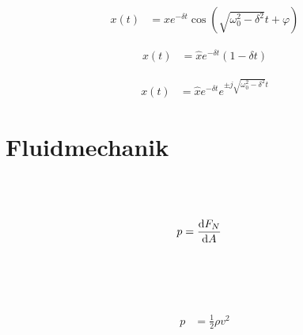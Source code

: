 \begin{boxleft}
\end{boxleft}\begin{boxrightshaded}
\begin{align}
x(t)&=\hat{x}e^{-\delta t}\cos(\sqrt{\omega_0^2-\delta^2}t+\varphi)
\end{align}
\end{boxrightshaded}

\begin{boxleft}
\end{boxleft}\begin{boxrightshaded}
\begin{align}
x(t)&=\hat{x}e^{-\delta t}(1-\delta t)
\end{align}
\end{boxrightshaded}

\begin{boxleft}
\end{boxleft}\begin{boxrightshaded}
\begin{align}
x(t)&=\hat{x}e^{-\delta t}e^{\pm j\sqrt{\omega_0^2-\delta^2}t}
\end{align}
\end{boxrightshaded}

\section{Fluidmechanik}

\begin{boxleft}
\\
\\
\end{boxleft}\begin{boxrightshaded}
\begin{align}
p&=\frac{\mathop{}\!\mathrm{d} F_N}{\mathop{}\!\mathrm{d} A}
\end{align}
\end{boxrightshaded}

\begin{boxleft}
\\
\\
\\
\end{boxleft}\begin{boxrightshaded}
\begin{align}
p&=\frac{1}{2}\rho v^2
\end{align}
\end{boxrightshaded}

